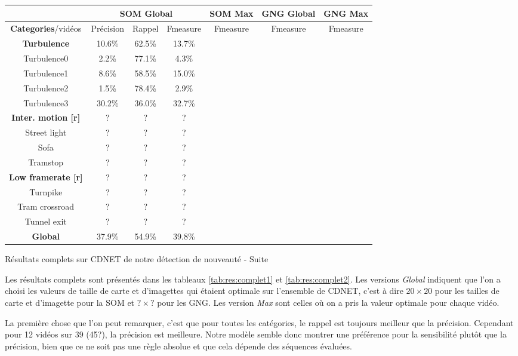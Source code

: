 	\begin{tableth}
    \begin{tabular}{|c|c|c|c|c|c|c|}
		\hline
		& \multicolumn{3}{c|}{SOM Global} & SOM Max & GNG Global & GNG Max\\
        \hline
        \textbf{Categories}/vidéos & Précision & Rappel & Fmeasure & Fmeasure & Fmeasure & Fmeasure\\
		\hline
        \textbf{Turbulence} & 10.6\% & 62.5\% & 13.7\% & & &\\
		\hline
		Turbulence0 & 2.2\% & 77.1\% & 4.3\% & & &\\
		Turbulence1 & 8.6\% & 58.5\% & 15.0\% & & &\\
		Turbulence2 & 1.5\% & 78.4\% & 2.9\% & & &\\
		Turbulence3 & 30.2\% & 36.0\% & 32.7\% & & &\\
		\hline
		\textbf{Inter. motion [r]} & ? & ? & ? & & &\\
		\hline
		Street light & ? & ? & ? & & &\\
		Sofa & ? & ? & ? & & &\\
		Tramstop & ? & ? & ? & & &\\
		\hline
        \textbf{Low framerate [r]} & ? & ? & ? & & &\\
		\hline
		Turnpike & ? & ? & ? & & &\\
		Tram crossroad & ? & ? & ? & & &\\
		Tunnel exit & ? & ? & ? & & &\\
        \hline
        \textbf{Global} & 37.9\% & 54.9\% & 39.8\% & & & \\
    	\hline
	\end{tabular}
	\caption{Résultats complets sur CDNET de notre détection de nouveauté - Suite}
	\label{tab:res:complet2}
	\end{tableth}

	Les résultats complets sont présentés dans les tableaux \ref{tab:res:complet1} et \ref{tab:res:complet2}. Les versions \textit{Global} indiquent que l'on a choisi les valeurs de taille de carte et d'imagettes qui étaient optimale sur l'ensemble de CDNET, c'est à dire $20\times20$ pour les tailles de carte et d'imagette pour la SOM et $?\times?$ pour les GNG. Les version \textit{Max} sont celles où on a pris la valeur optimale pour chaque vidéo.

	La première chose que l'on peut remarquer, c'est que pour toutes les catégories, le rappel est toujours meilleur que la précision. Cependant pour 12 vidéos sur 39 (45?), la précision est meilleure. Notre modèle semble donc montrer une préférence pour la sensibilité plutôt que la précision, bien que ce ne soit pas une règle absolue et que cela dépende des séquences évaluées. 

